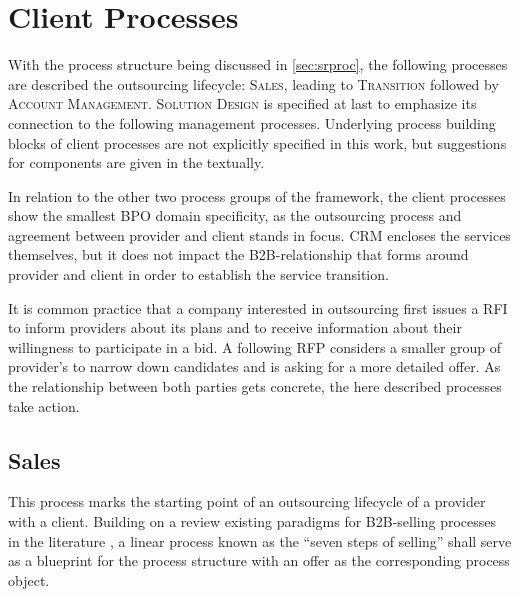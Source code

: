 	\newpage
	
	
	
	
	\section{Client Processes}
	With the process structure being discussed in \ref{sec:srproc}, the following processes are described \wrt the outsourcing lifecycle: \textsc{Sales}, leading to \textsc{Transition} followed by \textsc{Account Management}. \textsc{Solution Design} is specified at last to emphasize its connection to the following management processes. Underlying process building blocks of client processes are not explicitly specified in this work, but suggestions for components are given in the textually. 
	
	In relation to the other two process groups of the framework, the client processes show the smallest \acrshort{BPO} domain specificity, as the outsourcing process and agreement between provider and client stands in focus. \acrshort{CRM} encloses the services themselves, but it does not impact the B2B-relationship that forms around provider and client in order to establish the service transition. 
	
	It is common practice that a company interested in outsourcing first issues a \acrfull{RFI} to inform providers about its plans and to receive information about their willingness to participate in a bid. A following \acrfull{RFP} considers a smaller group of provider's to narrow down candidates and is asking for a more detailed offer. As the relationship between both parties gets concrete, the here described processes take action. 
	
	\subsection{Sales}
	\label{pr:sal}
	This process marks the starting point of an outsourcing lifecycle of a provider with a client. Building on a review existing paradigms for B2B-selling processes in the literature \citep{_ge_2011}, a linear process known as the  \enquote{seven steps of selling} shall serve as a blueprint for the process structure with an offer as the corresponding process object.
	
